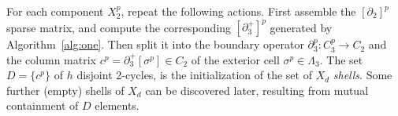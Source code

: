 For each component ${X}_2^p$, repeat the following actions. First assemble the $[\partial_2]^p$ sparse matrix, and compute the corresponding $[\partial_3^+]^p$ generated by Algorithm~\ref{alg:one}. Then split it into the boundary operator $\partial_3^p: C_3^p\to C_2$ and  the column matrix $c^p = \partial_3^+[\sigma^p] \in C_2$ of the exterior cell $\sigma^p\in\Lambda_3$.
The set $D = \{ c^p \}$ of $h$ disjoint 2-cycles, is the initialization of the set of $X_d$ \emph{shells}. Some further (empty) shells of $X_d$ can be discovered later, resulting from mutual containment of $D$ elements. 



